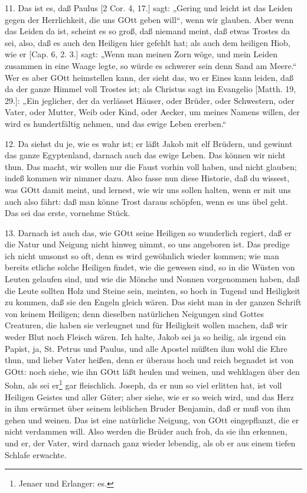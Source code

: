 11. Das ist es, daß Paulus [2 Cor. 4, 17.] sagt: „Gering und leicht ist das Leiden gegen der Herrlichkeit, die uns GOtt geben will“, wenn wir glauben. Aber wenn das Leiden da ist, scheint es so groß, daß niemand meint, daß etwas Trostes da sei, also, daß es auch den Heiligen hier gefehlt hat; als auch dem heiligen Hiob, wie er [Cap. 6, 2. 3.] sagt: „Wenn man meinen Zorn wöge, und mein Leiden zusammen in eine Waage legte, so würde es schwerer sein denn Sand am Meere.“ Wer es aber GOtt heimstellen kann, der sieht das, wo er Eines kann leiden, daß da der ganze Himmel voll Trostes ist; als Christus sagt im Evangelio [Matth. 19, 29.]: „Ein jeglicher, der da verlässet Häuser, oder Brüder, oder Schwestern, oder Vater, oder Mutter, Weib oder Kind, oder Aecker, um meines Namens willen, der wird es hundertfältig nehmen, und das ewige Leben ererben.“

12. Da siehst du je, wie es wahr ist; er läßt Jakob mit elf Brüdern, und gewinnt das ganze Egyptenland, darnach auch das ewige Leben. Das können wir nicht thun. Das macht, wir wollen nur die Faust vorhin voll haben, und nicht glauben; indeß kommen wir nimmer dazu. Also fasse nun diese Historie, daß du wissest, was GOtt damit meint, und lernest, wie wir uns sollen halten, wenn er mit uns auch also fährt: daß man könne Trost daraus schöpfen, wenn es uns übel geht. Das sei das erste, vornehme Stück.

13. Darnach ist auch das, wie GOtt seine Heiligen so wunderlich regiert, daß er die Natur und Neigung nicht hinweg nimmt, so uns angeboren ist. Das predige ich nicht umsonst so oft, denn es wird gewöhnlich wieder kommen; wie man bereits etliche solche Heiligen findet, wie die gewesen sind, so in die Wüsten von Leuten gelaufen sind, und wie die Mönche und Nonnen vorgenommen haben, daß die Leute sollten Holz und Steine sein, meinten, so hoch in Tugend und Heiligkeit zu kommen, daß sie
den Engeln gleich wären. Das sieht man in der ganzen Schrift von keinem Heiligen; denn dieselben natürlichen Neigungen sind Gottes Creaturen, die haben sie verleugnet und für Heiligkeit wollen machen, daß wir weder Blut noch Fleisch wären. Ich halte, Jakob sei ja so heilig, als irgend ein Papist, ja, St. Petrus und Paulus, und alle Apostel müßten ihm wohl die Ehre thun, und lieber Vater heißen, denn er überaus hoch und reich begnadet ist von GOtt: noch siehe, wie ihn GOtt läßt heulen und weinen, und wehklagen über den Sohn, als sei er\footnote{Jenaer und Erlanger: es.} gar fleischlich. Joseph, da er nun so viel erlitten hat, ist voll Heiligen Geistes und aller Güter; aber siehe, wie er so weich wird, und das Herz in ihm erwärmet über seinem leiblichen Bruder Benjamin, daß er muß von ihm gehen und weinen. Das ist eine natürliche Neigung, von GOtt eingepflanzt, die er nicht verdammen will. Also werden die Brüder auch froh, da sie ihn erkennen, und er, der Vater, wird darnach ganz wieder lebendig, als ob er aus einem tiefen Schlafe erwachte.

